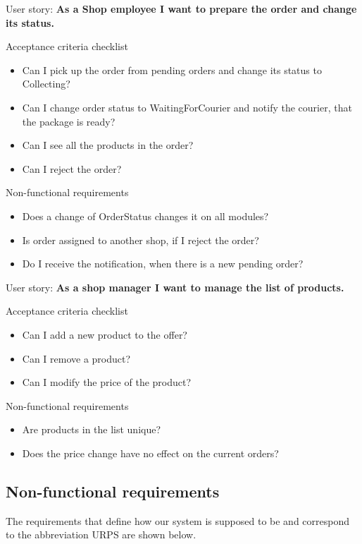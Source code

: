 \documentclass[../main.tex]{subfiles}
\begin{document}
\begin{oframed}
    User story: \textbf{As a Shop employee I want to prepare the order and change its status.}
    
    Acceptance criteria checklist
    \begin{itemize}
        \item Can I pick up the order from pending orders and change its status to Collecting?
        \item Can I change order status to WaitingForCourier and notify the courier, that the package is ready?
        \item Can I see all the products in the order?
        \item Can I reject the order?
    \end{itemize}
    Non-functional requirements
    \begin{itemize}
        \item Does a change of OrderStatus changes it on all modules?
        \item Is order assigned to another shop, if I reject the order?
        \item Do I receive the notification, when there is a new pending order?
    \end{itemize}
\end{oframed}
\vspace{5mm}
\begin{oframed}
    User story: \textbf{As a shop manager I want to manage the list of products.}
    
    Acceptance criteria checklist
    \begin{itemize}
        \item Can I add a new product to the offer?
        \item Can I remove a product?
        \item Can I modify the price of the product?
    \end{itemize}
    Non-functional requirements
    \begin{itemize}
        \item Are products in the list unique?
        \item Does the price change have no effect on the current orders?
    \end{itemize}
\end{oframed}

\subsection{Non-functional requirements}
The requirements that define how our system is supposed to be and correspond to the abbreviation URPS are shown below. 
\end{document}
